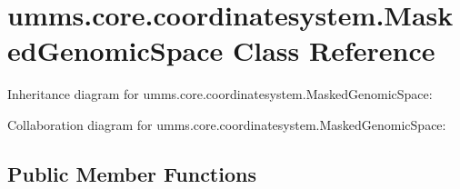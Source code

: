\hypertarget{classumms_1_1core_1_1coordinatesystem_1_1_masked_genomic_space}{\section{umms.\+core.\+coordinatesystem.\+Masked\+Genomic\+Space Class Reference}
\label{classumms_1_1core_1_1coordinatesystem_1_1_masked_genomic_space}
}


Inheritance diagram for umms.\+core.\+coordinatesystem.\+Masked\+Genomic\+Space\+:


Collaboration diagram for umms.\+core.\+coordinatesystem.\+Masked\+Genomic\+Space\+:
\subsection*{Public Member Functions}
